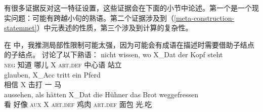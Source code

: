 有很多证据反对这一特征设置，这些证据会在下面的小节中论述。第一个是一个现实问题：可能有跨越小句的熟语。第二个证据涉及到（\ref{meta-construction-statemnet}）中元表述的性质，第三个涉及到计算的复杂性。


在 中，我推测局部性限制可能太强，因为可能会有成语在描述时需要借助子结点的子结点。 讨论了以下熟语：
\eal
\label{ex-idiom-non-nominative-external}
\ex 
\gll nicht wissen, wo    X\_Dat der Kopf steht\\
     \textsc{neg}   知道   哪儿 X   \textsc{art}.\textsc{def} 中心语 站立\\
\ex\label{mich-tritt-ein-Pferd}
\gll glauben, X\_Acc tritt ein Pferd\\
     相信  X     击打 一 马\\
\ex 
\gll aussehen, als hätten X\_Dat die Hühner das Brot weggefressen\\
     看        好像 \textsc{aux} X   \textsc{art}.\textsc{def} 鸡肉  \textsc{art}.\textsc{def} 面包 光.吃\\
\ex
\label{ex-look-as-if-butter}

